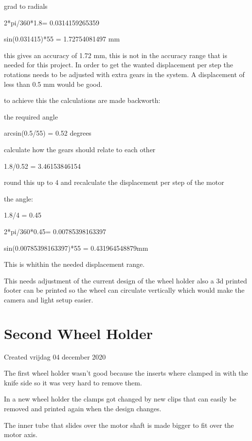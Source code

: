 \documentclass{article}
\begin{document}
grad to radials

2*pi/360*1.8= 0.0314159265359

sin(0.031415)*55 = 1.72754081497 mm



this gives an accuracy of 1.72 mm, this is not in the accuracy range that is needed for this project. In order to get the wanted displacement per step the rotations needs to be adjusted with extra gears in the system. A displacement of less than 0.5 mm would be good.



to achieve this the calculations are made backworth:

the required angle

arcsin(0.5/55) = 0.52 degrees 

calculate how the gears should relate to each other

1.8/0.52 = 3.46153846154



round this up to 4 and recalculate the displacement per step of the motor

the angle:

1.8/4 = 0.45

2*pi/360*0.45= 0.00785398163397

sin(0.00785398163397)*55 = 0.431964548879mm



This is whithin the needed displacement range.



This needs adjustment of the current design of the wheel holder also a 3d printed footer can be printed so the wheel can circulate vertically which would make the camera and light setup easier.


		\section{Second Wheel Holder}

Created vrijdag 04 december 2020



The first wheel holder wasn't good because the inserts where clamped in with the knife side so it was very hard to remove them.

In a new wheel holder the clamps got changed by new clips that can easily be removed and printed again when the design changes. 

The inner tube that slides over the motor shaft is made bigger to fit over the motor axis.
\end{document}
